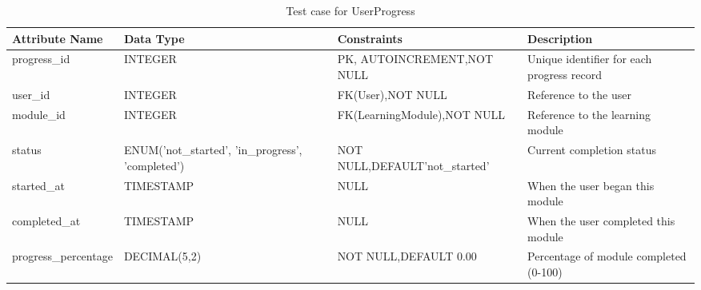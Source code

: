 \documentclass{FastFyp}
\begin{document}
\begin{samepage}


\begin{table}[H]
\footnotesize
\centering
\caption{Test case for UserProgress}
\begin{tabular}{|p{3cm}|p{2.3cm}|p{3.8cm}|p{4.4cm}|}
\hline
Attribute Name & Data Type & Constraints & Description \\ \hline
progress\_id & INTEGER & PK, AUTO\newline INCREMENT,\newline NOT NULL & Unique identifier for each progress record \\ \hline
user\_id & INTEGER & FK(User),\newline NOT NULL & Reference to the user \\ \hline
module\_id & INTEGER & FK(LearningModule),\newline NOT NULL & Reference to the learning module \\ \hline
status & ENUM('not\_started', 'in\_progress', 'completed') & NOT NULL,\newline DEFAULT\newline 'not\_started' & Current completion status \\ \hline
started\_at & TIMESTAMP & NULL & When the user began this module \\ \hline
completed\_at & TIMESTAMP & NULL & When the user completed this module \\ \hline
progress\_percentage & DECIMAL(5,2) & NOT NULL,\newline DEFAULT 0.00 & Percentage of module completed (0-100) \\ \hline
\end{tabular}
\end{table}
\end{samepage}
\end{document}
